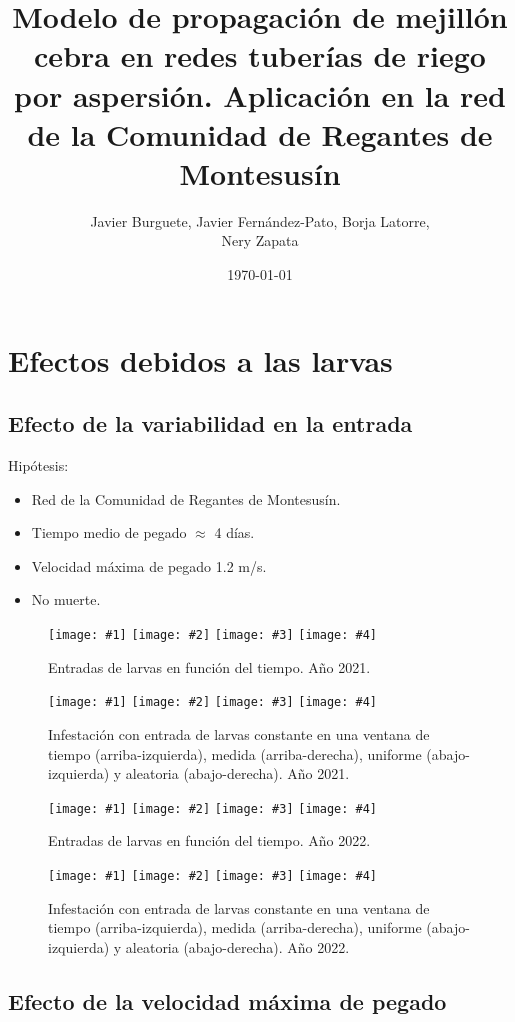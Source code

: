 \documentclass[a4paper]{article}
\author{Javier Burguete, Javier Fernández-Pato, Borja Latorre,\\ Nery Zapata}
\date{\today}
\title{Modelo de propagación de mejillón cebra en redes tuberías de riego por
aspersión. Aplicación en la red de la Comunidad de Regantes de Montesusín}
\newcommand{\FIGIV}[6]
{
	\begin{figure}[ht!]
		\centering
		\texttt{[image: \#1]}
		\texttt{[image: \#2]}
		\texttt{[image: \#3]}
		\texttt{[image: \#4]}
		\caption{#5.\label{#6}}
	\end{figure}
}
\begin{document}
\maketitle

\section{Efectos debidos a las larvas}

\subsection{Efecto de la variabilidad en la entrada}

Hipótesis:
\begin{itemize}
\item Red de la Comunidad de Regantes de Montesusín.
\item Tiempo medio de pegado $\approx$ 4 días.
\item Velocidad máxima de pegado 1.2 m/s.
\item No muerte.
\end{itemize}

\FIGIV{2021-mussel-input-constant.eps}{2021-mussel-input-measured.eps}
{2021-mussel-input-uniform.eps}{2021-mussel-input-random.eps}
{Entradas de larvas en función del tiempo. Año 2021}{Fig2021MusselInput}

\FIGIV{2021-mussel-constant.pdf}{2021-mussel-measured.pdf}
{2021-mussel-uniform.pdf}{2021-mussel-random.pdf}
{Infestación con entrada de larvas constante en una ventana de tiempo
(arriba-izquierda), medida (arriba-derecha), uniforme (abajo-izquierda) y
aleatoria (abajo-derecha). Año 2021}{Fig2021MusselRandom}

\FIGIV{2022-mussel-input-constant.eps}{2022-mussel-input-measured.eps}
{2022-mussel-input-uniform.eps}{2022-mussel-input-random.eps}
{Entradas de larvas en función del tiempo. Año 2022}{Fig2022MusselInput}

\FIGIV{2022-mussel-constant.pdf}{2022-mussel-measured.pdf}
{2022-mussel-uniform.pdf}{2022-mussel-random.pdf}
{Infestación con entrada de larvas constante en una ventana de tiempo
(arriba-izquierda), medida (arriba-derecha), uniforme (abajo-izquierda) y
aleatoria (abajo-derecha). Año 2022}{Fig2022MusselRandom}

\clearpage
\subsection{Efecto de la velocidad máxima de pegado}
\end{document}
